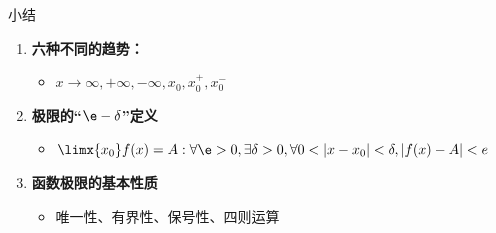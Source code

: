 \begin{frame}[<+->]{小结}
	\linespread{1.5}
	\begin{enumerate}
	  \item {\bf 六种不同的趋势：}
	  \begin{itemize}
	    \item \alert{$x\to\infty,+\infty,-\infty,x_0,x_0^+,x_0^-$}
	  \end{itemize}
	  \item {\bf 极限的“$\e-\delta$”定义}
	  \begin{itemize}
	    \item \alert{$\limx{x_0}f(x)=A:\forall\e>0,\exists\delta>0,\forall
	    0<|x-x_0|<\delta,|f(x)-A|<e$}
	  \end{itemize}
	  \item {\bf 函数极限的基本性质}
	  \begin{itemize}
	    \item 唯一性、有界性、保号性、四则运算
	  \end{itemize}
	\end{enumerate}
\end{frame}


